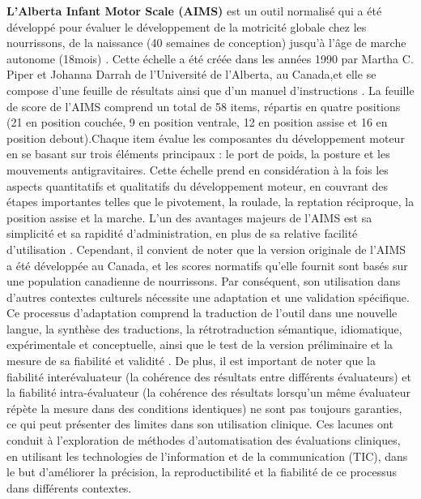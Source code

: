 \documentclass[5pt]{article}
\begin{document}
\textbf{L'Alberta Infant Motor Scale (AIMS)} est un outil normalisé qui a été développé pour évaluer le développement de la motricité globale chez les nourrissons, de la naissance (40 semaines de conception) jusqu'à l'âge de marche autonome (18mois) \cite{noauthor_motor_nodate}. Cette échelle a été créée dans les années 1990 par Martha C. Piper et Johanna Darrah de l'Université de l'Alberta, au Canada\cite{noauthor_motor_nodate},et elle se compose d'une feuille de résultats ainsi que d'un manuel d'instructions \cite{noauthor_motor_nodate}. La feuille de score de l'AIMS comprend un total de 58 items, répartis en quatre positions (21 en position couchée, 9 en position ventrale, 12 en position assise et 16 en position debout).Chaque item évalue les composantes du développement moteur en se basant sur trois éléments principaux : le port de poids, la posture et les mouvements antigravitaires. Cette échelle prend en considération à la fois les aspects quantitatifs et qualitatifs du développement moteur, en couvrant des étapes importantes telles que le pivotement, la roulade, la reptation réciproque, la position assise et la marche. L'un des avantages majeurs de l'AIMS est sa simplicité et sa rapidité d'administration, en plus de sa relative facilité d'utilisation \cite{eliks_alberta_2022}. Cependant, il convient de noter que la version originale de l'AIMS a été développée au Canada, et les scores normatifs qu'elle fournit sont basés sur une population canadienne de nourrissons. Par conséquent, son utilisation dans d'autres contextes culturels nécessite une adaptation et une validation spécifique. Ce processus d'adaptation comprend la traduction de l'outil dans une nouvelle langue, la synthèse des traductions, la rétrotraduction sémantique, idiomatique, expérimentale et conceptuelle, ainsi que le test de la version préliminaire et la mesure de sa fiabilité et validité \cite{boateng_best_2018}. De plus, il est important de noter que la fiabilité interévaluateur (la cohérence des résultats entre différents évaluateurs) et la fiabilité intra-évaluateur (la cohérence des résultats lorsqu'un même évaluateur répète la mesure dans des conditions identiques) ne sont pas toujours garanties, ce qui peut présenter des limites dans son utilisation clinique. Ces lacunes ont conduit à l'exploration de méthodes d'automatisation des évaluations cliniques, en utilisant les technologies de l'information et de la communication (TIC), dans le but d'améliorer la précision, la reproductibilité et la fiabilité de ce processus dans différents contextes.\\
 
\end{document}
